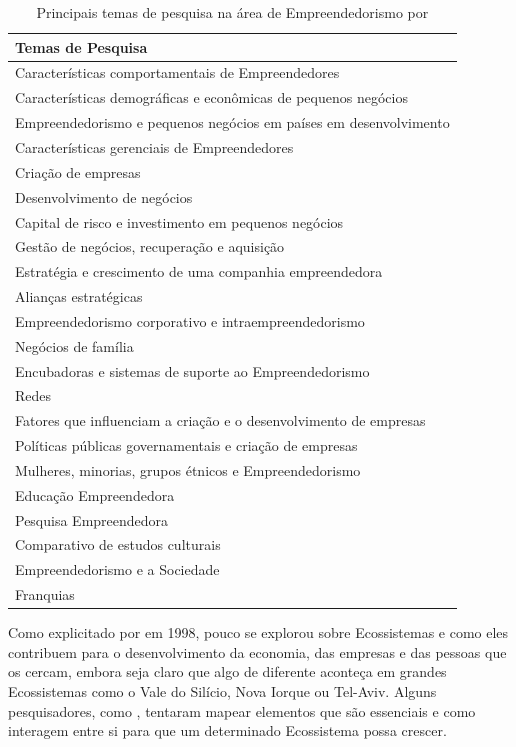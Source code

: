 \begin{table}[!htb]
	\centering
	\label{tabela:principais_temas_de_pesquisa_na_area_de_empreendedorismo}
	\begin{tabular}{ | p{15cm} |}
		\hline
		Temas de Pesquisa \\ \hline
		Características comportamentais de Empreendedores \\ \hline
		Características demográficas e econômicas de pequenos negócios \\ \hline
		Empreendedorismo e pequenos negócios em países em desenvolvimento \\ \hline
		Características gerenciais de Empreendedores \\ \hline
		Criação de empresas \\ \hline
		Desenvolvimento de negócios \\ \hline
		Capital de risco e investimento em pequenos negócios \\ \hline
		Gestão de negócios, recuperação e aquisição \\ \hline
		Estratégia e crescimento de uma companhia empreendedora \\ \hline
		Alianças estratégicas \\ \hline
		Empreendedorismo corporativo e intraempreendedorismo \\ \hline
		Negócios de família \\ \hline
		Encubadoras e sistemas de suporte ao Empreendedorismo \\ \hline
		Redes \\ \hline
		Fatores que influenciam a criação e o desenvolvimento de empresas \\ \hline
		Políticas públicas governamentais e criação de empresas \\ \hline
		Mulheres, minorias, grupos étnicos e Empreendedorismo \\ \hline
		Educação Empreendedora \\ \hline
		Pesquisa Empreendedora \\ \hline
		Comparativo de estudos culturais\\ \hline
		Empreendedorismo e a Sociedade \\ \hline
		Franquias \\ \hline
	\end{tabular}
	\caption{Principais temas de pesquisa na área de Empreendedorismo por \cite{Filion1998}}
\end{table}

Como explicitado por  em 1998, pouco se explorou sobre Ecossistemas e como eles contribuem para o desenvolvimento da economia, das empresas e das pessoas que os cercam, embora seja claro que algo de diferente aconteça em grandes Ecossistemas como o Vale do Silício, Nova Iorque ou Tel-Aviv. Alguns pesquisadores, como , tentaram mapear elementos que são essenciais e como interagem entre si para que um determinado Ecossistema possa crescer.

